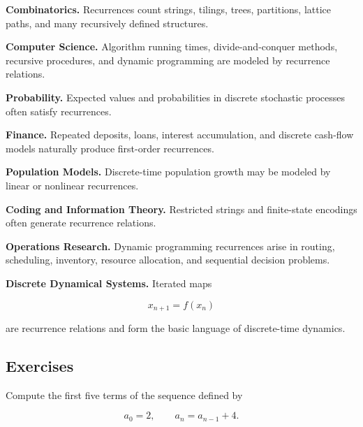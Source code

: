 \begin{applicationbox}

\textbf{Combinatorics.}
Recurrences count strings, tilings, trees, partitions, lattice paths,
and many recursively defined structures.

\medskip

\textbf{Computer Science.}
Algorithm running times, divide-and-conquer methods, recursive
procedures, and dynamic programming are modeled by recurrence
relations.

\medskip

\textbf{Probability.}
Expected values and probabilities in discrete stochastic processes
often satisfy recurrences.

\medskip

\textbf{Finance.}
Repeated deposits, loans, interest accumulation, and discrete cash-flow
models naturally produce first-order recurrences.

\medskip

\textbf{Population Models.}
Discrete-time population growth may be modeled by linear or nonlinear
recurrences.

\medskip

\textbf{Coding and Information Theory.}
Restricted strings and finite-state encodings often generate recurrence
relations.

\medskip

\textbf{Operations Research.}
Dynamic programming recurrences arise in routing, scheduling, inventory,
resource allocation, and sequential decision problems.

\medskip

\textbf{Discrete Dynamical Systems.}
Iterated maps

\[
x_{n+1}=f(x_n)
\]

are recurrence relations and form the basic language of discrete-time
dynamics.

\end{applicationbox}

\subsection{Exercises}
\label{subsec:recurrence-exercises}

\begin{exercise}[1]
Compute the first five terms of the sequence defined by

\[
a_0=2,
\qquad
a_n=a_{n-1}+4.
\]
\end{exercise}

